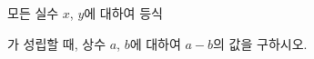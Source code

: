 모든 실수 $x$, $y$에 대하여 등식 \par\smallskip{}\par\smallskip\noindent 가 성립할 때, 상수 $a$, $b$에 대하여 $a-b$의 값을 구하시오.
